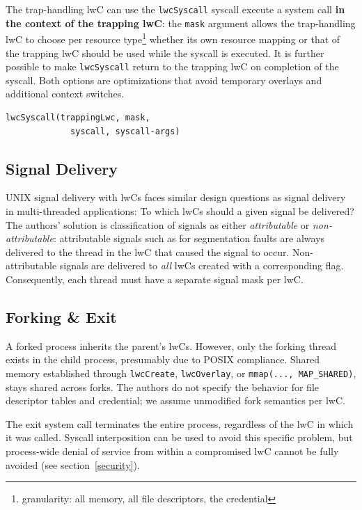 \documentclass[10pt,twocolumn,a4paper]{article}
\begin{document}
The trap-handling lwC can use the \lstinline{lwcSyscall} syscall execute a system call \textbf{in the context of the trapping lwC}:
the \lstinline{mask} argument allows the trap-handling lwC to choose per resource type\footnote{granularity: all memory, all file descriptors, the credential} whether its own resource mapping or that of the trapping lwC should be used while the syscall is executed.
It is further possible to make \lstinline{lwcSyscall} return to the trapping lwC on completion of the syscall.
Both options are optimizations that avoid temporary overlays and additional context switches.
\cite{lwcpaper,lwckernelrepo}

\begin{lstlisting}[style=syscallinline]
  lwcSyscall(trappingLwc, mask,
             syscall, syscall-args)
\end{lstlisting}

\subsection{Signal Delivery}
UNIX signal delivery with lwCs faces similar design questions as signal delivery in multi-threaded applications: To which lwCs should a given signal be delivered?
The authors' solution is classification of signals as either \textit{attributable} or \textit{non-attributable}:
attributable signals such as for segmentation faults are always delivered to the thread in the lwC that caused the signal to occur.
Non-attributable signals are delivered to \textit{all} lwCs created with a corresponding flag.
Consequently, each thread must have a separate signal mask per lwC.
\cite{lwcpaper}

\subsection{Forking \& Exit}
A forked process inherits the parent's lwCs.
However, only the forking thread exists in the child process, presumably due to POSIX compliance\cite{forkmultithread}. %
Shared memory established through \lstinline{lwcCreate}, \lstinline{lwcOverlay}, or \lstinline{mmap(..., MAP_SHARED)}, stays shared across forks.
The authors do not specify the behavior for file descriptor tables and credential; we assume unmodified fork semantics per lwC.
\cite{lwcpaper}

The exit system call terminates the entire process, regardless of the lwC in which it was called.
Syscall interposition can be used to avoid this specific problem, but process-wide denial of service from within a compromised lwC cannot be fully avoided (see section~\ref{security}).
\cite{lwcpaper}
\end{document}
